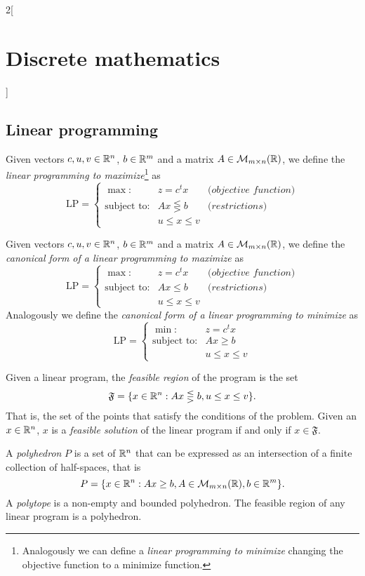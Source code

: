 \documentclass[../../../main.tex]{subfiles}
\begin{document}
\begin{multicols}{2}[\section{Discrete mathematics}]
\subsection{Linear programming}
\begin{definition}
Given vectors $c,u,v\in\mathbb{R} ^n$, $b\in\mathbb{R} ^m$ and a matrix $A\in\mathcal{M}_{m\times n}(\mathbb{R} )$, we define the \textit{linear programming to maximize}\footnote{Analogously we can define a \textit{linear programming to minimize} changing the objective function to a minimize function.} as $$\text{LP}=\left\{\begin{array}{rcl}
    \max: & z=c^tx & \textit{(objective function)} \\
    \text{subject to}: & Ax\lesseqgtr b & \textit{(restrictions)}\\
     & u\leq x\leq v & 
    \end{array}\right.$$
\end{definition}
\begin{definition}
Given vectors $c,u,v\in\mathbb{R} ^n$, $b\in\mathbb{R} ^m$ and a matrix $A\in\mathcal{M}_{m\times n}(\mathbb{R} )$, we define the \textit{canonical form of a linear programming to maximize} as $$\text{LP}=\left\{\begin{array}{rcl}
    \max: & z=c^tx & \textit{(objective function)} \\
    \text{subject to}: & Ax\leq b & \textit{(restrictions)}\\
     & u\leq x\leq v & 
    \end{array}\right.$$
Analogously we define the \textit{canonical form of a linear programming to minimize} as $$\text{LP}=\left\{\begin{array}{rc}
    \min: & z=c^tx \\
    \text{subject to}: & Ax\geq b\\
     & u\leq x\leq v
    \end{array}\right.$$
\end{definition}
\begin{definition}
Given a linear program, the \textit{feasible region} of the program is the set $$\mathfrak{F}=\{x\in\mathbb{R} ^n:Ax\lesseqgtr b,u\leq x\leq v\}.$$ That is, the set of the points that satisfy the conditions of the problem. Given an $x\in\mathbb{R} ^n$, $x$ is a \textit{feasible solution} of the linear program if and only if $x\in\mathfrak{F}$.
\end{definition}
\begin{definition}
A \textit{polyhedron} $P$ is a set of $\mathbb{R} ^n$ that can be expressed as an intersection of a finite collection of half-spaces, that is $$P=\{x\in\mathbb{R} ^n:Ax\geq b, A\in\mathcal{M}_{m\times n}(\mathbb{R} ),b\in\mathbb{R} ^m\}.$$ A \textit{polytope} is a non-empty and bounded polyhedron. The feasible region of any linear program is a polyhedron.

\end{definition}
\end{multicols}
\end{document}
